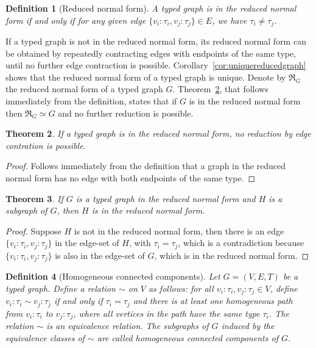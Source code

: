 \documentclass[preprint,12pt]{elsarticle}
\theoremstyle{plain}
\newtheorem{theorem}{Theorem}[section]
\newtheorem{definition}[theorem]{Definition}
\newcommand\tyv[2]{#1\!\!:\!\!#2}
\newcommand\subgraph{\subseteq}
\begin{document}
\begin{definition}[Reduced normal form]
A typed graph is in the reduced normal form if and only if for any given edge $\{\tyv{v_i}{\tau_i}, \tyv{v_j}{\tau_j}\}\in E$,
we have $\tau_i \neq \tau_j$.
\end{definition}

If a typed graph is not in the reduced normal form, its reduced normal form can be obtained by
repeatedly contracting edges with endpoints of the same type, until no further 
edge contraction is possible.
Corollary~\ref{cor:uniquereducedgraph} shows that the reduced normal form of a typed graph is unique.
Denote by $\Re_G$ the reduced normal form of a typed graph $G$.
Theorem~\ref{theorem:noreduction}, that follows immediately from the definition,
states that if $G$ is in the reduced normal form then $\Re_G\simeq G$
and no further reduction is possible.

\begin{theorem}\label{theorem:noreduction}
If a typed graph is in the reduced normal form,
no reduction by edge contration is possible.
\end{theorem}
\begin{proof}
Follows immediately from the definition that
a graph in the reduced normal form has no
edge with both endpoints of the same type.
\end{proof}

\begin{theorem}\label{theorem:reducedsubgraph}
If $G$ is a typed graph in the reduced normal form
and $H$ is a subgraph of $G$, then
$H$ is in the reduced normal form.
\end{theorem}
\begin{proof}
Suppose $H$ is not in the reduced normal form, then there is
an edge $\{\tyv{v_i}{\tau_i}, \tyv{v_j}{\tau_j}\}$ in the edge-set of $H$,
with $\tau_i=\tau_j$, which is a contradiction because $\{\tyv{v_i}{\tau_i}, \tyv{v_j}{\tau_j}\}$
is also in the edge-set of $G$, which is in the reduced normal form.
\end{proof}

\begin{definition}[Homogeneous connected components]\label{def:connectedcomponent}
Let $G = (V,E,T)$ be a typed graph.
Define a relation $ \sim $ on $V$ as follows: for all $\tyv{v_i}{\tau_i}, \tyv{v_j}{\tau_j} \in V$,
define $\tyv{v_i}{\tau_i} \sim \tyv{v_j}{\tau_j}$ if and only if $\tau_i = \tau_j$ and there is at least one
homogeneous path from $\tyv{v_i}{\tau_i}$ to $\tyv{v_j}{\tau_j}$,
where all vertices in the path have the same type $\tau_i$.
The relation $\sim$ is an equivalence relation.
The subgraphs of $G$ induced by the equivalence classes of $\sim $ are
called \textit{homogeneous connected components} of $G$.
\end{definition}
\end{document}
